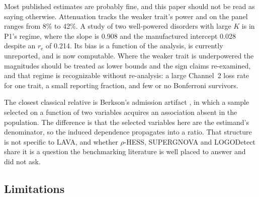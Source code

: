 \documentclass[12pt,a4paper]{article}
\newcommand{\re}{r_{\mathrm{e}}}
\begin{document}
Most published estimates are probably fine, and this paper should not be read as saying
otherwise. Attenuation tracks the weaker trait's power and on the panel ranges from 8\% to
42\%. A study of two well-powered disorders with large $K$ is in P1's regime, where the
slope is 0.908 and the manufactured intercept 0.028 despite an $\re$ of 0.214. Its bias is a function of the analysis, is currently unreported, and is now computable. Where the weaker trait is
underpowered the magnitudes should be treated as lower bounds and the sign claims
re-examined, and that regime is recognizable without re-analysis: a large Channel~2 loss
rate for one trait, a small reporting fraction, and few or no Bonferroni survivors.

The closest classical relative is Berkson's admission artifact \citep[][]{ref14}, in which a
sample selected on a function of two variables acquires an association absent in the
population. The difference is that the selected variables here are the estimand's
denominator, so the induced dependence propagates into a ratio. That structure is not
specific to LAVA, and whether $\rho$-HESS, SUPERGNOVA and LOGODetect share it is a
question the benchmarking literature \citep{ref5} is well placed to answer and did not
ask.
\subsection{Limitations}\label{sec:limitations}
\end{document}
